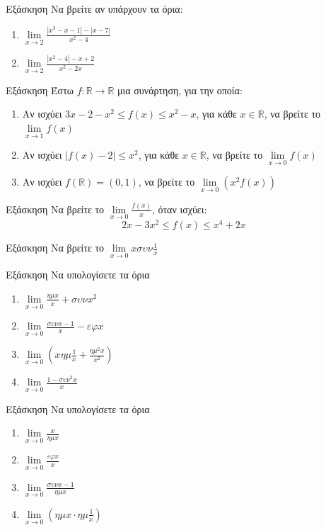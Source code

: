 \documentclass[greek]{beamer}
\begin{document}
\begin{frame}{Εξάσκηση}
 Να βρείτε αν υπάρχουν τα όρια:
 \begin{enumerate}
  \item $\lim\limits_{x \to 2}{ \frac{|x^3-x-1|-|x-7|}{x^2-4} }$ \pause
  \item $\lim\limits_{x \to 2}{ \frac{|x^2-4|-x+2}{x^2-2x} }$
 \end{enumerate}
\end{frame}

\begin{frame}{Εξάσκηση}
 Έστω $f:\mathbb{R}\to\mathbb{R}$ μια συνάρτηση, για την οποία:
 \begin{enumerate}
  \item Αν ισχύει $3x-2-x^2\le f(x) \le x^2-x$, για κάθε $x\in\mathbb{R}$, να βρείτε το $\lim\limits_{x \to 1}{ f(x) }$ \pause
  \item Αν ισχύει $|f(x)-2|\le x^2$, για κάθε $x\in\mathbb{R}$, να βρείτε το $\lim\limits_{x \to 0}{ f(x) }$ \pause
  \item Αν ισχύει $f(\mathbb{R})=(0,1)$, να βρείτε το $\lim\limits_{x \to 0}{ \left(x^2f(x)  \right) }$
 \end{enumerate}
\end{frame}

\begin{frame}{Εξάσκηση}
 Να βρείτε το $\lim\limits_{x \to 0}{ \frac{f(x)}{x} }$, όταν ισχύει:
 $$2x-3x^2\le f(x) \le x^4+2x$$
\end{frame}

\begin{frame}{Εξάσκηση}
 Να βρείτε το $\lim\limits_{x \to 0}{ xσυν\frac{1}{x} }$
\end{frame}

\begin{frame}{Εξάσκηση}
 Να υπολογίσετε τα όρια
 \begin{enumerate}
  \item $\lim\limits_{x \to 0}{ \frac{ημx}{x}+συνx^2 }$ \pause
  \item $\lim\limits_{x \to 0}{ \frac{συνx-1}{x}-εφx }$ \pause
  \item $\lim\limits_{x \to 0}{ \left( xημ\frac{1}{x}+\frac{ημ^2x}{x^2} \right)}$ \pause
  \item $\lim\limits_{x \to 0}{ \frac{1-συν^2x}{x} }$
 \end{enumerate}
\end{frame}

\begin{frame}{Εξάσκηση}
 Να υπολογίσετε τα όρια
 \begin{enumerate}
  \item $\lim\limits_{x \to 0}{ \frac{x}{ημx} }$ \pause
  \item $\lim\limits_{x \to 0}{ \frac{εφx}{x} }$ \pause
  \item $\lim\limits_{x \to 0}{ \frac{συνx-1}{ημx} }$ \pause
  \item $\lim\limits_{x \to 0}{ \left( ημx\cdot ημ\frac{1}{x} \right) }$
 \end{enumerate}
\end{frame}
\end{document}
